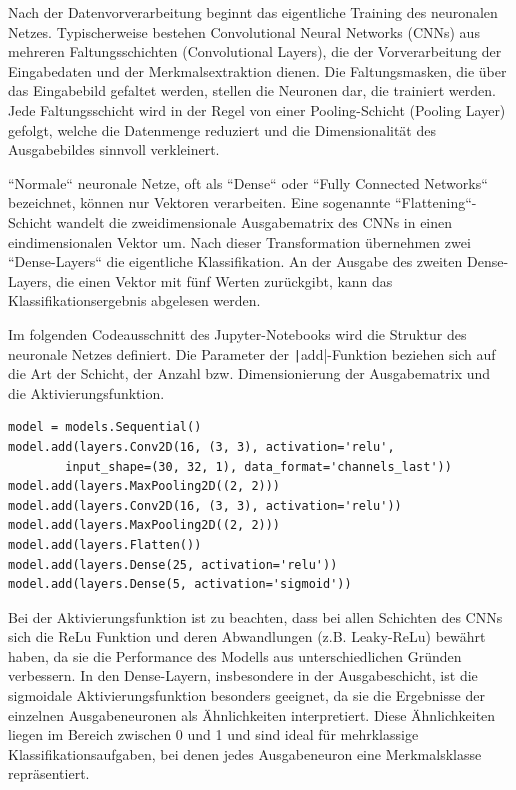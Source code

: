 Nach der Datenvorverarbeitung beginnt das eigentliche Training des neuronalen Netzes. Typischerweise bestehen Convolutional Neural Networks (CNNs) aus mehreren Faltungsschichten (Convolutional Layers), die der Vorverarbeitung der Eingabedaten und der Merkmalsextraktion dienen. Die Faltungsmasken, die über das Eingabebild gefaltet werden, stellen die Neuronen dar, die trainiert werden. Jede Faltungsschicht wird in der Regel von einer Pooling-Schicht (Pooling Layer) gefolgt, welche die Datenmenge reduziert und die Dimensionalität des Ausgabebildes sinnvoll verkleinert. \cite{how-cnn-work}

``Normale`` neuronale Netze, oft als ``Dense`` oder ``Fully Connected Networks`` bezeichnet, können nur Vektoren verarbeiten. Eine sogenannte ``Flattening``-Schicht wandelt die zweidimensionale Ausgabematrix des CNNs in einen eindimensionalen Vektor um. Nach dieser Transformation übernehmen zwei ``Dense-Layers`` die eigentliche Klassifikation. An der Ausgabe des zweiten Dense-Layers, die einen Vektor mit fünf Werten zurückgibt, kann das Klassifikationsergebnis abgelesen werden. \cite{how-cnn-work}

Im folgenden Codeausschnitt des Jupyter-Notebooks wird die Struktur des neuronale Netzes definiert. Die Parameter der \texttt|add|-Funktion beziehen sich auf die Art der Schicht, der Anzahl bzw. Dimensionierung der Ausgabematrix und die Aktivierungsfunktion.

\begin{verbatim}
model = models.Sequential()
model.add(layers.Conv2D(16, (3, 3), activation='relu', 
		input_shape=(30, 32, 1), data_format='channels_last'))
model.add(layers.MaxPooling2D((2, 2)))
model.add(layers.Conv2D(16, (3, 3), activation='relu'))
model.add(layers.MaxPooling2D((2, 2)))
model.add(layers.Flatten())
model.add(layers.Dense(25, activation='relu'))
model.add(layers.Dense(5, activation='sigmoid'))	
\end{verbatim}

Bei der Aktivierungsfunktion ist zu beachten, dass bei allen Schichten des CNNs sich die ReLu Funktion und deren Abwandlungen (z.B. Leaky-ReLu) bewährt haben, da sie die Performance des Modells aus unterschiedlichen Gründen verbessern. In den Dense-Layern, insbesondere in der Ausgabeschicht, ist die sigmoidale Aktivierungsfunktion besonders geeignet, da sie die Ergebnisse der einzelnen Ausgabeneuronen als Ähnlichkeiten interpretiert. Diese Ähnlichkeiten liegen im Bereich zwischen 0 und 1 und sind ideal für mehrklassige Klassifikationsaufgaben, bei denen jedes Ausgabeneuron eine Merkmalsklasse repräsentiert. \cite{cnn-relu-sigmoid}


